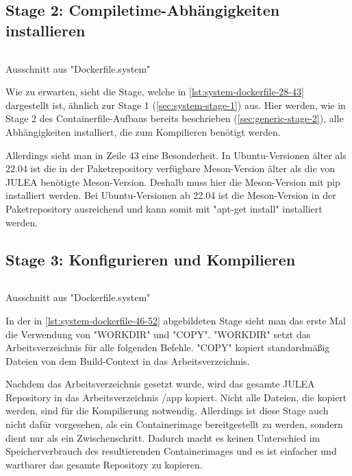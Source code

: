 \pagebreak

\subsection{Stage 2: Compiletime-Abhängigkeiten installieren} \label{sec:system-stage-2}

\begin{listing}[H]
    \inputminted[firstline=28,lastline=43]{dockerfile}{./code-examples/Dockerfile.system}
    \caption{Ausschnitt aus "Dockerfile.system"}
    \label{lst:system-dockerfile-28-43}
\end{listing}

Wie zu erwarten, sieht die Stage, welche in \cref{lst:system-dockerfile-28-43} dargestellt ist, ähnlich zur Stage 1 (\cref{sec:system-stage-1}) aus. Hier werden, wie in Stage 2 des Containerfile-Aufbaus bereits beschrieben (\cref{sec:generic-stage-2}), alle Abhängigkeiten installiert, die zum Kompilieren benötigt werden.

Allerdings sieht man in Zeile 43 eine Besonderheit. In Ubuntu-Versionen älter als 22.04 ist die in der Paketrepository verfügbare Meson-Version älter als die von JULEA benötigte Meson-Version. Deshalb muss hier die Meson-Version mit pip \cite{pythonInstallingPackagesPython} installiert werden. Bei Ubuntu-Versionen ab 22.04 ist die Meson-Version in der Paketrepository ausreichend und kann somit mit "apt-get install" installiert werden.

\subsection{Stage 3: Konfigurieren und Kompilieren} \label{sec:system-stage-3}

\begin{listing}[H]
    \inputminted[firstline=46,lastline=52]{dockerfile}{./code-examples/Dockerfile.system}
    \caption{Ausschnitt aus "Dockerfile.system"}
    \label{lst:system-dockerfile-46-52}
\end{listing}

In der in \cref{lst:system-dockerfile-46-52} abgebildeten Stage sieht man das erste Mal die Verwendung von "WORKDIR" und "COPY". "WORKDIR" setzt das Arbeitsverzeichnis für alle folgenden Befehle. "COPY" kopiert standardmäßig Dateien von dem Build-Context in das Arbeitsverzeichnis.

Nachdem das Arbeitsverzeichnis gesetzt wurde, wird das gesamte JULEA Repository in das Arbeitsverzeichnis /app kopiert. Nicht alle Dateien, die kopiert werden, sind für die Kompilierung notwendig. Allerdings ist diese Stage auch nicht dafür vorgesehen, als ein Containerimage bereitgestellt zu werden, sondern dient nur als ein Zwischenschritt. Dadurch macht es keinen Unterschied im Speicherverbrauch des resultierenden Containerimages und es ist einfacher und wartbarer das gesamte Repository zu kopieren.

